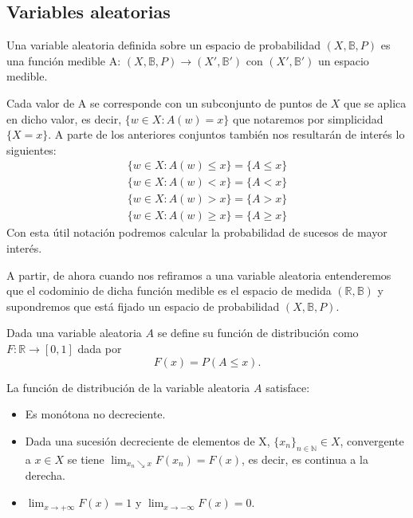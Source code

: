 \documentclass[../proyecto.tex]{memoir}
\begin{document}
\subsection{Variables aleatorias}

\begin{defi}
Una variable aleatoria definida sobre un espacio de probabilidad $(X, \mathds{B}, P)$ es una función medible A: $(X, \mathds{B}, P) \rightarrow  (X', \mathds{B}')$ con $(X', \mathds{B}')$ un espacio medible.
\end{defi}

Cada valor de A se corresponde con un subconjunto de puntos de $X$ que se aplica en dicho valor, es decir, $ \{ w\in X : A(w)=x\}$ que notaremos por simplicidad $\{X = x\}$. A parte de los anteriores conjuntos también nos resultarán de interés lo siguientes:
\begin{align*}
\{ w\in X : A(w) \leq x\} = \{ A \leq x \} \\
\{ w\in X : A(w) < x\} = \{ A < x \} \\
\{ w\in X : A(w) > x\} = \{ A > x \} \\
\{ w\in X : A(w) \geq x\} = \{ A \geq x \}
\end{align*}
Con esta útil notación podremos calcular la probabilidad de sucesos de mayor interés.

A partir, de ahora cuando nos refiramos a una variable aleatoria entenderemos que el codominio de dicha función medible es el espacio de medida $(\mathds{R},\mathds{B})$ y supondremos que está fijado un espacio de probabilidad $(X, \mathds{B}, P)$.

\begin{defi}
Dada una variable aleatoria $A$ se define su función de distribución como $ F : \mathds{R} \rightarrow [0,1] $ dada por 
$$
F(x)=P(A \leq x).
$$
\end{defi}

\begin{prop}
La función de distribución de la variable aleatoria $A$ satisface:

\begin{itemize}
\item Es monótona no decreciente.
\item Dada una sucesión decreciente de elementos de X, $\{x_n\}_{n \in \mathds{N}} \in X$, convergente a $x\in X$ se tiene $\lim_{x_n \searrow x} F(x_n) = F(x)$, es decir, es continua a la derecha. 
\item $\lim_{x\to+\infty} F(x) = 1$ y $\lim_{x\to-\infty} F(x) = 0$.
\end{itemize}

\end{prop}
\end{document}
